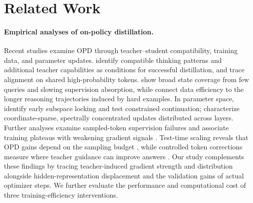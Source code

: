 
\section{Related Work}

\paragraph{Empirical analyses of on-policy distillation.}
Recent studies examine OPD through teacher--student compatibility, training data, and parameter updates. \citet{li2026rethinking} identify compatible thinking patterns and additional teacher capabilities as conditions for successful distillation, and trace alignment on shared high-probability tokens. \citet{fu2026rethinking} show broad state coverage from few queries and slowing supervision absorption, while \citet{hou2026matters} connect data efficiency to the longer reasoning trajectories induced by hard examples. In parameter space, \citet{shen2026geometry} identify early subspace locking and test constrained continuation; \citet{yu2026dense} characterize coordinate-sparse, spectrally concentrated updates distributed across layers. Further analyses examine sampled-token supervision failures \citep{fu2026revisiting} and associate training plateaus with weakening gradient signals \citep{zhao2026vanishing}. Test-time scaling reveals that OPD gains depend on the sampling budget \citep{ge2026testtime}, while controlled token corrections measure where teacher guidance can improve answers \citep{li2026demystifying}. Our study complements these findings by tracing teacher-induced gradient strength and distribution alongside hidden-representation displacement and the validation gains of actual optimizer steps. We further evaluate the performance and computational cost of three training-efficiency interventions.

